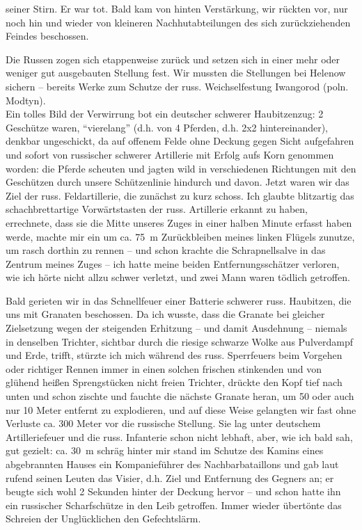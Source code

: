 seiner Stirn. Er war tot. Bald kam von hinten Verstärkung, wir rückten vor, nur noch hin und wieder von kleineren Nachhutabteilungen des sich zurückziehenden Feindes beschossen.

Die Russen zogen sich etappenweise zurück und setzen sich in einer mehr oder weniger gut ausgebauten Stellung fest. Wir mussten die Stellungen bei Helenow sichern -- bereits Werke zum Schutze der russ. Weichselfestung Iwangorod (poln. Modtyn).\\

Ein tolles Bild der Verwirrung bot ein deutscher schwerer Haubitzenzug: 2 Geschütze waren, \enquote{vierelang} (d.h. von 4 Pferden, d.h. 2x2 hintereinander), denkbar ungeschickt, da auf offenem Felde ohne Deckung gegen Sicht aufgefahren und sofort von russischer schwerer Artillerie mit Erfolg aufs Korn genommen worden: die Pferde scheuten und jagten wild in verschiedenen Richtungen mit den Geschützen durch unsere Schützenlinie hindurch und davon. Jetzt waren wir das Ziel der russ. Feldartillerie, die zunächst zu kurz schoss. Ich glaubte blitzartig das schachbrettartige Vorwärtstasten der russ. Artillerie erkannt zu haben, errechnete, dass sie die Mitte unseres Zuges in einer halben Minute erfasst haben werde, machte mir ein um ca. 75~m Zurückbleiben meines linken Flügels zunutze, um rasch dorthin zu rennen -- und schon krachte die Schrapnellsalve in das Zentrum meines Zuges -- ich hatte meine beiden Entfernungsschätzer verloren, wie ich hörte nicht allzu schwer verletzt, und zwei Mann waren tödlich getroffen.

Bald gerieten wir in das Schnellfeuer einer Batterie schwerer russ. Haubitzen, die uns mit Granaten beschossen. Da ich wusste, dass die Granate bei gleicher Zielsetzung wegen der steigenden Erhitzung -- und damit Ausdehnung -- niemals in denselben Trichter, sichtbar durch die riesige schwarze Wolke aus Pulverdampf und Erde, trifft, stürzte ich mich während des russ. Sperrfeuers beim Vorgehen oder richtiger Rennen immer in einen solchen frischen stinkenden und von glühend heißen Sprengstücken nicht freien Trichter, drückte den Kopf tief nach unten und schon zischte und fauchte die nächste Granate heran, um 50 oder auch nur 10 Meter entfernt zu explodieren, und auf diese Weise gelangten wir fast ohne Verluste ca. 300 Meter vor die russische Stellung. Sie lag unter deutschem Artilleriefeuer und die russ. Infanterie schon nicht lebhaft, aber, wie ich bald sah, gut gezielt: ca. 30~m schräg hinter mir stand im Schutze des Kamins eines abgebrannten Hauses ein Kompanieführer des Nachbarbataillons und gab laut rufend seinen Leuten das Visier, d.h. Ziel und Entfernung des Gegners an; er beugte sich wohl 2 Sekunden hinter der Deckung hervor -- und schon hatte ihn ein russischer Scharfschütze in den Leib getroffen. Immer wieder übertönte das Schreien der Unglücklichen den Gefechtslärm.

